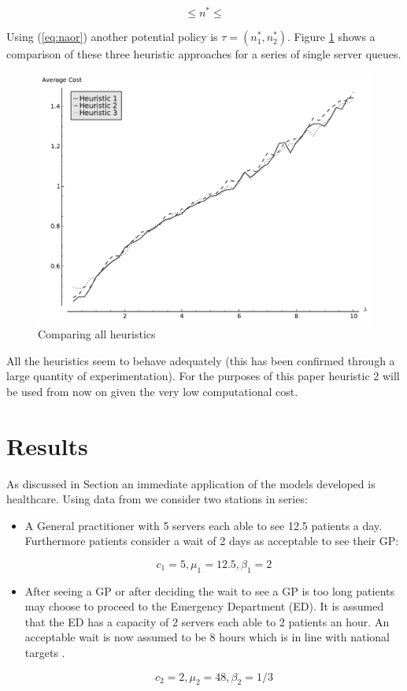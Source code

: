 \documentclass[12pt]{article}
\begin{document}
\begin{equation}\label{eq:naor}
  \leq  n ^ * \leq
\end{equation}

Using (\ref{eq:naor}) another potential policy is $\tau = (n^*_1, n^*_2)$.
Figure \ref{allheuristics} shows a comparison of these three heuristic approaches for a series of single server queues.

\begin{figure}[!hbtp]
    \begin{center}
        \includegraphics[width=.6\textwidth]{Images/Exit0.pdf}
    \end{center}
    \caption{Comparing all heuristics}\label{allheuristics}
\end{figure}

All the heuristics seem to behave adequately (this has been confirmed through a large quantity of experimentation).
For the purposes of this paper heuristic 2 will be used from now on given the very low computational cost.

\section{Results}\label{results}

As discussed in Section \label{introduction} an immediate application of the models developed is healthcare.
Using data from \cite{} we consider two stations in series:

\begin{itemize}
    \item A General practitioner with 5 servers each able to see 12.5 patients a day. Furthermore patients consider a wait of 2 days as acceptable to see their GP:

        $$c_1=5, \mu_1=12.5, \beta_1=2$$

    \item After seeing a GP or after deciding the wait to see a GP is too long \cite{FINDSOMEPOPNEWSABOUTTHIS} patients may choose to proceed to the Emergency Department (ED). It is assumed that the ED has a capacity of 2 servers each able to 2 patients an hour. An acceptable wait is now assumed to be 8 hours which is in line with national targets \cite{}.

        $$c_2=2, \mu_2=48, \beta_2=1/3$$
\end{itemize}
\end{document}
